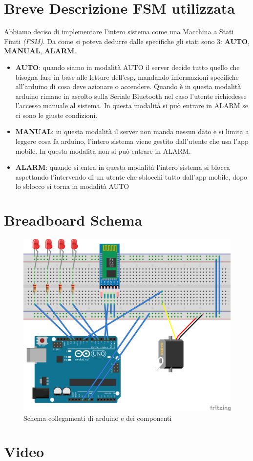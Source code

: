 \documentclass[a4paper,12pt]{report}
\begin{document}
	\chapter{Breve Descrizione FSM utilizzata}
	Abbiamo deciso di implementare l'intero sistema come una Macchina a Stati Finiti \textit{(FSM)}. Da come si poteva dedurre dalle specifiche gli stati sono 3: \textbf{AUTO}, \textbf{MANUAL}, \textbf{ALARM}.
	\begin{itemize}
		\item \textbf{AUTO}: quando siamo in modalità AUTO il server decide tutto quello che bisogna fare in base alle letture dell'esp, mandando informazioni specifiche all'arduino di cosa deve azionare o accendere. Quando è in questa modalità arduino rimane in ascolto sulla Seriale Bluetooth nel caso l'utente richiedesse l'accesso manuale al sistema. In questa modalità si può entrare in ALARM se ci sono le giuste condizioni.
		\item \textbf{MANUAL}: in questa modalità il server non manda nessun dato e si limita a leggere cosa fa arduino, l'intero sistema viene gestito dall'utente che usa l'app mobile. In questa modalità non si può entrare in ALARM.
		\item \textbf{ALARM}: quando si entra in questa modalità l'intero sistema si blocca aspettando l'intervendo di un utente che sblocchi tutto dall'app mobile, dopo lo sblocco si torna in modalità AUTO
	\end{itemize}
	\chapter{Breadboard Schema}
		\begin{figure}[!htb]
			\centerline{\includegraphics[scale=0.9]{iot3_bb.png}}
			\caption{Schema collegamenti di arduino e dei componenti}
			\label{img:analysis}
		\end{figure}	
	\chapter{Video}
	
	
\end{document}
